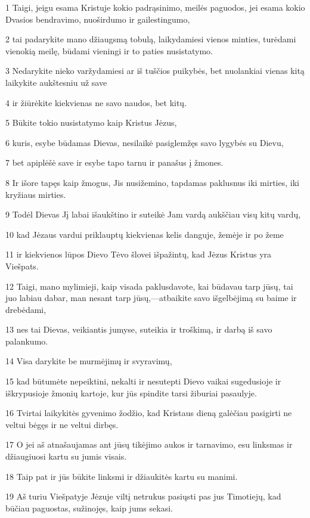 \par 1 Taigi, jeigu esama Kristuje kokio padrąsinimo, meilės paguodos, jei esama kokio Dvasios bendravimo, nuoširdumo ir gailestingumo, 
\par 2 tai padarykite mano džiaugsmą tobulą, laikydamiesi vienos minties, turėdami vienokią meilę, būdami vieningi ir to paties nusistatymo. 
\par 3 Nedarykite nieko varžydamiesi ar iš tuščios puikybės, bet nuolankiai vienas kitą laikykite aukštesniu už save 
\par 4 ir žiūrėkite kiekvienas ne savo naudos, bet kitų. 
\par 5 Būkite tokio nusistatymo kaip Kristus Jėzus, 
\par 6 kuris, esybe būdamas Dievas, nesilaikė pasiglemžęs savo lygybės su Dievu, 
\par 7 bet apiplėšė save ir esybe tapo tarnu ir panašus į žmones. 
\par 8 Ir išore tapęs kaip žmogus, Jis nusižemino, tapdamas paklusnus iki mirties, iki kryžiaus mirties. 
\par 9 Todėl Dievas Jį labai išaukštino ir suteikė Jam vardą aukščiau visų kitų vardų, 
\par 10 kad Jėzaus vardui priklauptų kiekvienas kelis danguje, žemėje ir po žeme 
\par 11 ir kiekvienos lūpos Dievo Tėvo šlovei išpažintų, kad Jėzus Kristus yra Viešpats. 
\par 12 Taigi, mano mylimieji, kaip visada paklusdavote, kai būdavau tarp jūsų, tai juo labiau dabar, man nesant tarp jūsų,—atbaikite savo išgelbėjimą su baime ir drebėdami, 
\par 13 nes tai Dievas, veikiantis jumyse, suteikia ir troškimą, ir darbą iš savo palankumo. 
\par 14 Visa darykite be murmėjimų ir svyravimų, 
\par 15 kad būtumėte nepeiktini, nekalti ir nesutepti Dievo vaikai sugedusioje ir iškrypusioje žmonių kartoje, kur jūs spindite tarsi žiburiai pasaulyje. 
\par 16 Tvirtai laikykitės gyvenimo žodžio, kad Kristaus dieną galėčiau pasigirti ne veltui bėgęs ir ne veltui dirbęs. 
\par 17 O jei aš atnašaujamas ant jūsų tikėjimo aukos ir tarnavimo, esu linksmas ir džiaugiuosi kartu su jumis visais. 
\par 18 Taip pat ir jūs būkite linksmi ir džiaukitės kartu su manimi. 
\par 19 Aš turiu Viešpatyje Jėzuje viltį netrukus pasiųsti pas jus Timotiejų, kad būčiau paguostas, sužinojęs, kaip jums sekasi. 
